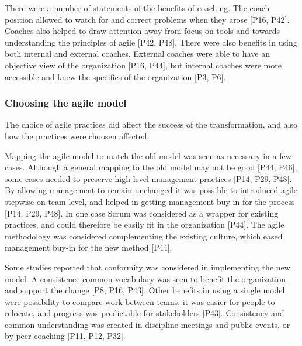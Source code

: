 \documentclass[preprint,authoryear,12pt]{elsarticle}
\begin{document}
There were a number of statements of the benefits of coaching. The coach
position allowed to watch for and correct problems when they arose [P16, P42].
Coaches also helped to draw attention away from focus on tools and towards
understanding the principles of agile [P42, P48].
There were also benefits in using both internal and external coaches.
External coaches were able to have an objective view of the organization [P16,
P44], but internal coaches were more accessible and knew the specifics of the
organization [P3, P6].


\subsubsection{Choosing the agile model}

The choice of agile practices did affect the success of the transformation, and
also how the practices were choosen affected.



Mapping the agile model to match the old model was seen as necessary in a few
cases. Although a general mapping to the old model may not be good [P44, P46],
some cases needed to preserve high level management practices [P14, P29, P48].
By allowing management to remain unchanged it was possible to introduced agile
stepwise on team level, and helped in getting management buy-in for the process
[P14, P29, P48].
In one case Scrum was considered as a wrapper for existing practices, and could
therefore be easily fit in the organization [P44]. The agile methodology was
considered complementing the existing culture, which eased management buy-in for
the new method [P44].



Some studies reported that conformity was considered in implementing the new
model. A consistence common vocabulary was seen to benefit the organization and
support the change [P8, P16, P43]. Other benefits in using a single model were
possibility to compare work between teams, it was easier for people to relocate,
and progress was predictable for stakeholders [P43]. Consistency and common
understanding was created in discipline meetings and public events, or by peer
coaching [P11, P12, P32].
\end{document}
